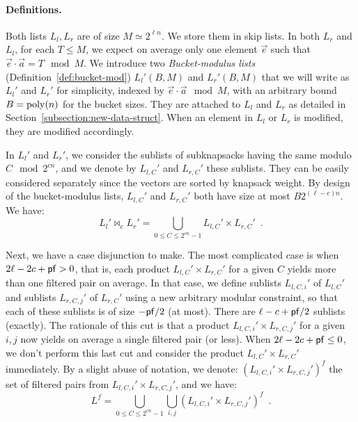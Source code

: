 
\paragraph{Definitions.}
Both lists $L_l, L_r$ are of size $M \simeq 2^{\ell n}$. We store them in skip lists. In both $L_r$ and $L_l$, for each $T \leq M$, we expect on average only one element $\vec{e}$ such that $\vec{e} \cdot \vec{a}  = T \mod{M}$. We introduce two \emph{Bucket-modulus lists} (Definition~\ref{def:bucket-mod}) $L_l'(B,M)$ and $L_r'(B,M)$ that we will write as $L_l'$ and $L_r'$ for simplicity, indexed by $\vec{e} \cdot \vec{a} \mod{M}$, with an arbitrary bound $B = \operatorname{poly}(n)$ for the bucket sizes. They are attached to $L_l$ and $L_r$ as detailed in Section~\ref{subsection:new-data-struct}. When an element in $L_l$ or $L_r$ is modified, they are modified accordingly.

In $L_l'$ and $L_r'$, we consider the sublists of subknapsacks having the same modulo $C \mod{2^{cn}}$, and we denote by $L_{l,C}'$ and $L_{r,C}'$ these sublists. They can be easily considered separately since the vectors are sorted by knapsack weight. By design of the bucket-modulus lists, $L_{l,C}'$ and $L_{r,C}'$ both have size at most $B 2^{(\ell-c)n}$. We have:
$$ L_l' \bowtie_c L_r' = \bigcup_{0 \leq C \leq 2^{cn} - 1} L_{l,C}' \times L_{r,C}' \enspace.$$

Next, we have a case disjunction to make. The most complicated case is when $2\ell - 2c + \mathsf{pf} > 0$, that is, each product $L_{l,C}' \times L_{r,C}'$ for a given $C$ yields more than one filtered pair on average. In that case, we define sublists $L_{l,C,i}'$ of $L_{l,C}'$ and sublists $L_{r,C,j}'$ of $L_{r,C}'$ using a new arbitrary modular constraint, so that each of these sublists is of size $-\mathsf{pf}/2$ (at most). There are $\ell-c + \mathsf{pf}/2$ sublists (exactly). The rationale of this cut is that a product $L_{l,C,i}' \times L_{r,C,j}'$ for a given $i,j$ now yields on average a single filtered pair (or less). When $2\ell - 2c + \mathsf{pf} \leq 0$, we don't perform this last cut and consider the product $L_{l,C}' \times L_{r,C}'$ immediately. By a slight abuse of notation, we denote: $(L_{l,C,i}' \times L_{r,C,j}')^f$ the set of filtered pairs from $L_{l,C,i}' \times L_{r,C,j}'$, and we have:
$$ L^f =  \bigcup_{0 \leq C \leq 2^{cn} - 1} \bigcup_{i,j}(L_{l,C,i}' \times L_{r,C,j}')^f \enspace. $$

